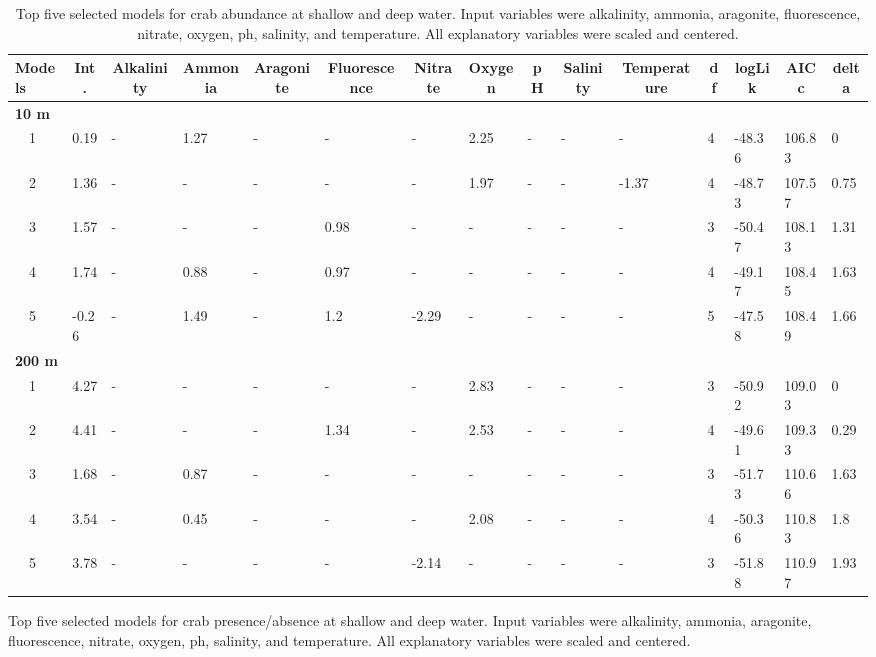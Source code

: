 \documentclass[letterpaper,12pt]{article}\usepackage[]{graphicx}\usepackage[]{color}
\begin{document}
\begin{landscape}
\centering\vspace*{\fill}
\begin{table}[!tbp]
{\scriptsize
\caption{Top five selected models for crab abundance at shallow and deep water. Input variables were alkalinity, ammonia, aragonite, fluorescence, nitrate, oxygen, ph, salinity, and temperature. All explanatory variables were scaled and centered.\label{tab:abutab}} 
\begin{center}
\begin{tabular}{lllllllllllllll}
\hline\hline
\multicolumn{1}{l}{Models}&\multicolumn{1}{c}{Int.}&\multicolumn{1}{c}{Alkalinity}&\multicolumn{1}{c}{Ammonia}&\multicolumn{1}{c}{Aragonite}&\multicolumn{1}{c}{Fluorescence}&\multicolumn{1}{c}{Nitrate}&\multicolumn{1}{c}{Oxygen}&\multicolumn{1}{c}{pH}&\multicolumn{1}{c}{Salinity}&\multicolumn{1}{c}{Temperature}&\multicolumn{1}{c}{df}&\multicolumn{1}{c}{logLik}&\multicolumn{1}{c}{AICc}&\multicolumn{1}{c}{delta}\tabularnewline
\hline
{\bfseries 10 m}&&&&&&&&&&&&&&\tabularnewline
~~1&0.19&-&1.27&-&-&-&2.25&-&-&-&4&-48.36&106.83&0\tabularnewline
~~2&1.36&-&-&-&-&-&1.97&-&-&-1.37&4&-48.73&107.57&0.75\tabularnewline
~~3&1.57&-&-&-&0.98&-&-&-&-&-&3&-50.47&108.13&1.31\tabularnewline
~~4&1.74&-&0.88&-&0.97&-&-&-&-&-&4&-49.17&108.45&1.63\tabularnewline
~~5&-0.26&-&1.49&-&1.2&-2.29&-&-&-&-&5&-47.58&108.49&1.66\tabularnewline
\hline
{\bfseries 200 m}&&&&&&&&&&&&&&\tabularnewline
~~1&4.27&-&-&-&-&-&2.83&-&-&-&3&-50.92&109.03&0\tabularnewline
~~2&4.41&-&-&-&1.34&-&2.53&-&-&-&4&-49.61&109.33&0.29\tabularnewline
~~3&1.68&-&0.87&-&-&-&-&-&-&-&3&-51.73&110.66&1.63\tabularnewline
~~4&3.54&-&0.45&-&-&-&2.08&-&-&-&4&-50.36&110.83&1.8\tabularnewline
~~5&3.78&-&-&-&-&-2.14&-&-&-&-&3&-51.88&110.97&1.93\tabularnewline
\hline
\end{tabular}\end{center}}
\end{table}
\begin{table}[!tbp]
{\scriptsize
\caption{Top five selected models for crab presence/absence at shallow and deep water. Input variables were alkalinity, ammonia, aragonite, fluorescence, nitrate, oxygen, ph, salinity, and temperature. All explanatory variables were scaled and centered.\label{tab:patab}} 
}
\end{table}
\end{landscape}
\end{document}
